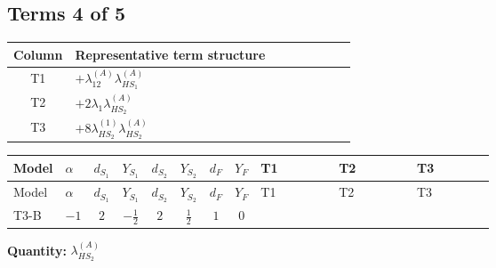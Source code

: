 \documentclass[8pt]{article}
\begin{document}
\begin{landscape}
\subsection*{Terms 4 of 5}
\begin{center}
\begin{tabular}{@{}c >{\raggedright\arraybackslash}p{0.82\linewidth}@{}}
\toprule
Column & Representative term structure \\
\midrule
T1 & \(\displaystyle +{\lambda_{12}^{(A)}} {\lambda_{HS_1}^{(A)}}\) \\
\midrule
T2 & \(\displaystyle +2 {\lambda_1} {\lambda_{HS_2}^{(A)}}\) \\
\midrule
T3 & \(\displaystyle +8 {\lambda_{HS_2}^{(1)}} {\lambda_{HS_2}^{(A)}}\) \\
\midrule
\bottomrule
\end{tabular}
\end{center}
\smallskip
\tiny
\begin{longtable}{@{}llcccccc >{\raggedright\arraybackslash}p{0.21\linewidth} >{\raggedright\arraybackslash}p{0.21\linewidth} >{\raggedright\arraybackslash}p{0.21\linewidth}@{}}
\toprule
Model & $\alpha$ & $d_{S_1}$ & $Y_{S_1}$ & $d_{S_2}$ & $Y_{S_2}$ & $d_F$ & $Y_F$ & T1 & T2 & T3 \\
\midrule
\endfirsthead
\toprule
Model & $\alpha$ & $d_{S_1}$ & $Y_{S_1}$ & $d_{S_2}$ & $Y_{S_2}$ & $d_F$ & $Y_F$ & T1 & T2 & T3 \\
\midrule
\endhead
T3-B & $-1$ & $2$ & $-\frac{1}{2}$ & $2$ & $\frac{1}{2}$ & $1$ & $0$ & \scriptsize\adjustbox{max width=\linewidth}{$\begin{gathered} +{\lambda_{12}^{(A)}} {\lambda_{HS_1}^{(A)}}\end{gathered}$} & \scriptsize\adjustbox{max width=\linewidth}{$\begin{gathered} +2 {\lambda_1} {\lambda_{HS_2}^{(A)}}\end{gathered}$} & \scriptsize\adjustbox{max width=\linewidth}{$\begin{gathered} +8 {\lambda_{HS_2}^{(1)}} {\lambda_{HS_2}^{(A)}}\end{gathered}$} \\
\midrule
\bottomrule
\end{longtable}
\clearpage
\noindent\textbf{Quantity: }$\lambda_{HS_2}^{(A)}$\par\smallskip

\end{landscape}
\end{document}
